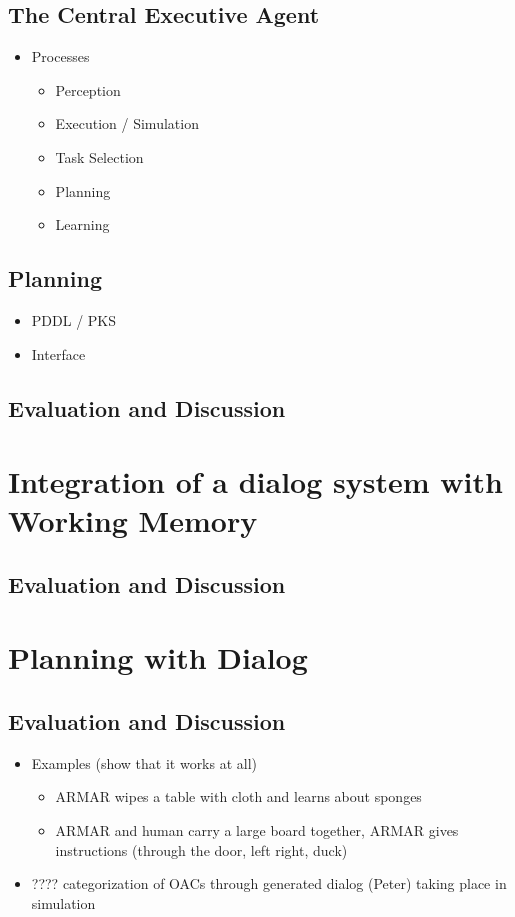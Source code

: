 \documentclass[english,ngerman]{KITreprt}
\begin{document}
\section{The Central Executive Agent}
\begin{itemize}
    \item Processes
        \begin{itemize}
            \item Perception
            \item Execution / Simulation
            \item Task Selection
            \item Planning
            \item Learning
        \end{itemize}
\end{itemize}

\section{Planning}
\begin{itemize}
    \item PDDL / PKS
    \item Interface
\end{itemize}

\section{Evaluation and Discussion}


\chapter{Integration of a dialog system with Working Memory}

\section{Evaluation and Discussion}

\chapter{Planning with Dialog}

\section{Evaluation and Discussion}
\begin{itemize}
    \item Examples (show that it works at all)
        \begin{itemize}
            \item ARMAR wipes a table with cloth and learns about sponges
            \item ARMAR and human carry a large board together, ARMAR gives instructions
                (through the door, left right, duck)
        \end{itemize}
    \item ???? categorization of OACs through generated dialog (Peter) taking place in simulation
\end{itemize}
\end{document}

